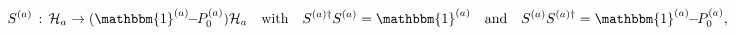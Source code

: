 \begin{equation}
 S^{(a)}\,:\,\mathcal{H}_a\rightarrow (\mathbbm{1}^{(a)}\!\!
 -\!\!P_0^{(a)})\mathcal{H}_a\quad\text{with}
 \quad S^{(a)\dagger}S^{(a)}=\mathbbm{1}^{(a)}\quad\text{and}\quad
 S^{(a)}S^{(a)\dagger} = \mathbbm{1}^{(a)}\!\!-\!\!P_0^{(a)},
\end{equation}

